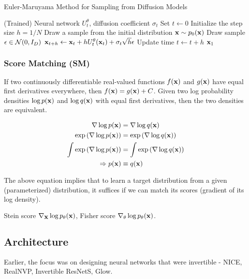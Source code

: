 \documentclass[a4paper, 11pt]{article}
\begin{document}
\begin{algorithm}
    \caption{Euler-Maruyama Method for Sampling from Diffusion Models \citep{sarkka2019applied}}\label{alg:diff_sample}
    \begin{algorithmic}[1]
    \Require (Trained) Neural network $U_t^{\theta}$, diffusion coefficient $\sigma_t$
    \State Set $t \gets 0$
    \State Initialize the step size $h = 1 / N$
    \State Draw a sample from the initial distribution $\mbox{$\mbox{$\mathbf{x}$}$} \sim p_0(\mbox{$\mbox{$\mathbf{x}$}$})$
    \State Draw sample $\epsilon \in \mbox{$\cal N$}(0, I_D)$
    \State $\mbox{$\mbox{$\mathbf{x}$}$}_{t+h} \gets \mbox{$\mbox{$\mathbf{x}$}$}_t + h U_t^{\theta}(\mbox{$\mbox{$\mathbf{x}$}$}_t) + \sigma_t \sqrt{h}\epsilon$
    \State Update time $t \gets t + h$
    \EndFor
    \State \Return $\mbox{$\mbox{$\mathbf{x}$}$}_1$
    \end{algorithmic}
\end{algorithm}


\subsubsection{Score Matching (SM)}
If two continuously differentiable real-valued functions $f(\mbox{$\mbox{$\mathbf{x}$}$})$ and $g(\mbox{$\mbox{$\mathbf{x}$}$})$ have equal first derivatives everywhere, then $f(\mbox{$\mbox{$\mathbf{x}$}$}) = g(\mbox{$\mbox{$\mathbf{x}$}$}) + C$. Given two log probability densities $\log p(\mbox{$\mbox{$\mathbf{x}$}$})$ and $\log q(\mbox{$\mbox{$\mathbf{x}$}$})$ with equal first derivatives, then the two densities are equivalent.

\begin{align}
    \nabla \log p(\mbox{$\mbox{$\mathbf{x}$}$}) &= \nabla \log q(\mbox{$\mbox{$\mathbf{x}$}$}) \\ 
    \exp \left (\nabla \log p(\mbox{$\mbox{$\mathbf{x}$}$}) \right ) &= \exp \left (\nabla \log q(\mbox{$\mbox{$\mathbf{x}$}$}) \right) \\
    \int \exp \left (\nabla \log p(\mbox{$\mbox{$\mathbf{x}$}$}) \right ) &= \int \exp \left (\nabla \log q(\mbox{$\mbox{$\mathbf{x}$}$}) \right) \\ 
    \Rightarrow p(\mbox{$\mbox{$\mathbf{x}$}$}) &\equiv  q(\mbox{$\mbox{$\mathbf{x}$}$})
\end{align}

The above equation implies that to learn a target distribution from a given (parameterized) distribution, it suffices if we can match its scores (gradient of its log density).

Stein score $\nabla_{\mbox{$\mbox{$\mathbf{x}$}$}} \log p_{\theta}(\mbox{$\mbox{$\mathbf{x}$}$})$, Fisher score $\nabla_{\theta}\log p_{\theta}(\mbox{$\mbox{$\mathbf{x}$}$})$.

\subsection{Architecture}
Earlier, the focus was on designing neural networks that were invertible - NICE, RealNVP, Invertible ResNetS, Glow.
\end{document}
